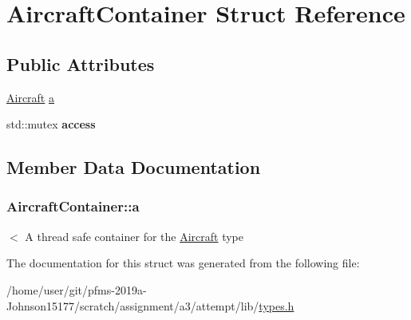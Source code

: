 \hypertarget{structAircraftContainer}{}\section{Aircraft\+Container Struct Reference}
\label{structAircraftContainer}
\subsection*{Public Attributes}
\begin{DoxyCompactItemize}
\item 
\hyperlink{structAircraft}{Aircraft} \hyperlink{structAircraftContainer_a47f37483bcb18c2b147391289df80f01}{a}
\item 
std\+::mutex {\bfseries access}\hypertarget{structAircraftContainer_a0c52481859d8864b461224958c339533}{}\label{structAircraftContainer_a0c52481859d8864b461224958c339533}

\end{DoxyCompactItemize}


\subsection{Member Data Documentation}
\subsubsection[{\texorpdfstring{a}{a}}]{ Aircraft\+Container\+::a}\hypertarget{structAircraftContainer_a47f37483bcb18c2b147391289df80f01}{}\label{structAircraftContainer_a47f37483bcb18c2b147391289df80f01}
$<$ A thread safe container for the \hyperlink{structAircraft}{Aircraft} type 

The documentation for this struct was generated from the following file\+:\begin{DoxyCompactItemize}
\item 
/home/user/git/pfms-\/2019a-\/\+Johnson15177/scratch/assignment/a3/attempt/lib/\hyperlink{types_8h}{types.\+h}\end{DoxyCompactItemize}
